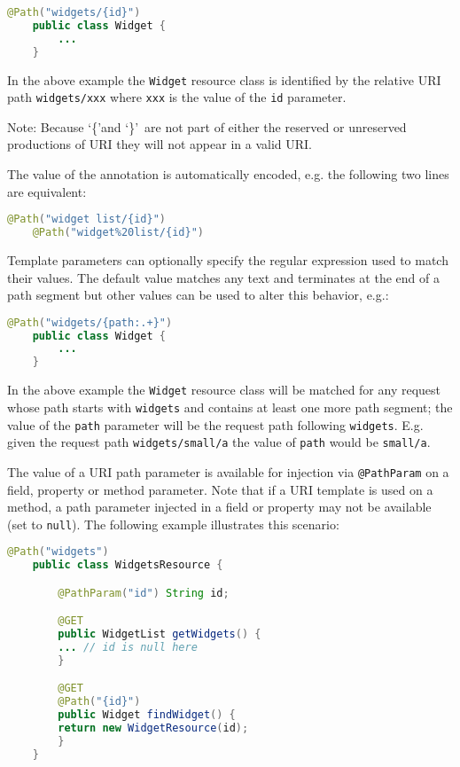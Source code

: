 \begin{lstlisting}[language=Java]
    @Path("widgets/{id}")
    public class Widget {
        ...
    }
\end{lstlisting}

In the above example the \lstinline{Widget} resource class is identified by the relative URI path
\lstinline{widgets/xxx} where \lstinline{xxx} is the value of the \lstinline{id} parameter.

Note: Because \lq\{\rq and \lq\}\rq\ are not part of either the reserved or unreserved productions of URI they will not
appear in a valid URI.

The value of the annotation is automatically encoded, e.g. the following two lines are equivalent:

\begin{lstlisting}[language=Java]
    @Path("widget list/{id}")
    @Path("widget%20list/{id}")
\end{lstlisting}

Template parameters can optionally specify the regular expression used to match their values. The default value matches
any text and terminates at the end of a path segment but other values can be used to alter this behavior, e.g.:

\begin{lstlisting}[language=Java]
    @Path("widgets/{path:.+}")
    public class Widget {
        ...
    }
\end{lstlisting}

In the above example the \lstinline{Widget} resource class will be matched for any request whose path starts with
\lstinline{widgets} and contains at least one more path segment; the value of the \lstinline{path} parameter will be the
request path following \lstinline{widgets}. E.g. given the request path \lstinline{widgets/small/a} the value of
\lstinline{path} would be \lstinline{small/a}.

The value of a URI path parameter is available for injection via \lstinline{@PathParam} on a field, property or method
parameter. Note that if a URI template is used on a method, a path parameter injected in a field or property may not be
available (set to \lstinline{null}). The following example illustrates this scenario:

\begin{lstlisting}[language=Java]
    @Path("widgets")
    public class WidgetsResource {

        @PathParam("id") String id;

        @GET
        public WidgetList getWidgets() {
        ... // id is null here
        }

        @GET
        @Path("{id}")
        public Widget findWidget() {
        return new WidgetResource(id);
        }
    }
\end{lstlisting}

